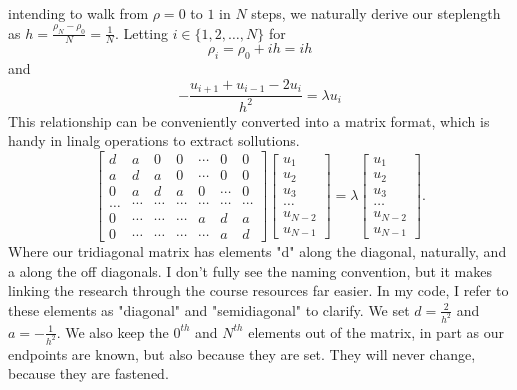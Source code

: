 \documentclass[10pt, twocolumn]{article}
\begin{document}
intending to walk from $\rho = 0$ to $1$ in $N$ steps, we naturally derive our steplength as 
$h = \frac{\rho_N - \rho_0}{N} = \frac{1}{N}$. Letting $i \in \{ 1, 2, \ldots, N\}$ for 
\[\rho_i = \rho_0 + ih = ih\] and
\[ -\frac{u_{i+1} + u_{i-1} - 2u_{i}}{h^2} = \lambda u_i\]
This relationship can be conveniently converted into a matrix format, which is handy in linalg 
operations to extract sollutions. 
\begin{equation}
    \begin{bmatrix} d& a & 0   & 0    & \cdots  &0     & 0 \\
                                a & d & a & 0    & \cdots  &0     &0 \\
                                0   & a & d & a  &0       &\cdots & 0\\
                                \dots  & \cdots & \cdots & \cdots  &\cdots      &\cdots & \cdots\\
                                0   & \cdots & \cdots & \cdots  &a  &d & a\\
                                0   & \cdots & \cdots & \cdots  &\cdots       &a & d\end{bmatrix} 
                                 \begin{bmatrix} u_1 \\ u_2 \\ u_3 \\ \dots \\ u_{N-2} \\ u_{N-1}\end{bmatrix} 
                                     = \lambda \begin{bmatrix} u_1 \\ u_2 \\ u_3 \\ \dots \\ u_{N-2} \\ u_{N-1}\end{bmatrix} . 
\label{eq:matrixse} 
\end{equation}
Where our tridiagonal matrix has elements "d" along the diagonal, naturally, and a along the 
off diagonals. I don't fully see the naming convention, but it makes linking the research 
through the course resources far easier. In my code, I refer to these elements as "diagonal" 
and "semidiagonal" to clarify. We set $d = \frac{2}{h^2}$ and $a = -\frac{1}{h^2}$. We also keep 
the $0^{th}$ and $N^{th}$ elements out of the matrix, in part as our endpoints are known, but 
also because they are set. They will never change, because they are fastened. 
\end{document}

